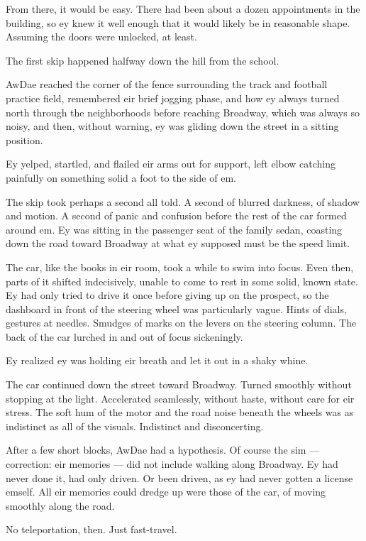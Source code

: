 From there, it would be easy. There had been about a dozen appointments in the building, so ey knew it well enough that it would likely be in reasonable shape. Assuming the doors were unlocked, at least.

The first skip happened halfway down the hill from the school.

AwDae reached the corner of the fence surrounding the track and football practice field, remembered eir brief jogging phase, and how ey always turned north through the neighborhoods before reaching Broadway, which was always so noisy, and then, without warning, ey was gliding down the street in a sitting position.

Ey yelped, startled, and flailed eir arms out for support, left elbow catching painfully on something solid a foot to the side of em.

The skip took perhaps a second all told. A second of blurred darkness, of shadow and motion. A second of panic and confusion before the rest of the car formed around em. Ey was sitting in the passenger seat of the family sedan, coasting down the road toward Broadway at what ey supposed must be the speed limit.

The car, like the books in eir room, took a while to swim into focus. Even then, parts of it shifted indecisively, unable to come to rest in some solid, known state. Ey had only tried to drive it once before giving up on the prospect, so the dashboard in front of the steering wheel was particularly vague. Hints of dials, gestures at needles. Smudges of marks on the levers on the steering column. The back of the car lurched in and out of focus sickeningly.

Ey realized ey was holding eir breath and let it out in a shaky whine.

The car continued down the street toward Broadway. Turned smoothly without stopping at the light. Accelerated seamlessly, without haste, without care for eir stress. The soft hum of the motor and the road noise beneath the wheels was as indistinct as all of the visuals. Indistinct and disconcerting.

After a few short blocks, AwDae had a hypothesis. Of course the sim — correction: eir memories — did not include walking along Broadway. Ey had never done it, had only driven. Or been driven, as ey had never gotten a license emself. All eir memories could dredge up were those of the car, of moving smoothly along the road.

No teleportation, then. Just fast-travel.


